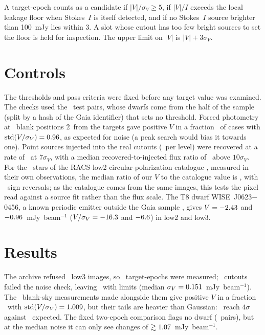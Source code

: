 \documentclass[RNAAS]{aastex631}
\begin{document}
A target-epoch counts as a candidate if $|V|/\sigma_V\geq5$, if $|V|/I$ exceeds the local
leakage floor when Stokes~$I$ is itself detected, and if no Stokes~$I$ source brighter than
100~mJy lies within 3\arcmin. A slot whose cutout has too few bright sources to set the floor is
held for inspection. The upper limit on $|V|$ is $|V|+3\sigma_V$.

\section{Controls}
\label{sec:controls}
The thresholds and pass criteria were fixed before any target value was examined. The checks
used the \ucdvRealSzeroN\ test pairs, whose dwarfs come from the half of the sample (split by a
hash of the Gaia identifier) that sets no threshold. Forced photometry at
\ucdvRealConeN\ blank positions 2\arcmin\ from the targets gave positive $V$ in a fraction
\ucdvRealConePos\ of cases with $\mathrm{std}(V/\sigma_V)=0.96$, as expected
for noise (a peak search would bias it towards one). Point
sources injected into the real cutouts (\ucdvRealCtwoN\ per level) were recovered at a rate of
\ucdvRealCtwoComp\ at $7\sigma_V$, with a median recovered-to-injected flux ratio of
\ucdvRealCtwoRatio\ above $10\sigma_V$. For the \ucdvRealCthreeN\ stars of the RACS-low2
circular-polarization catalogue \citep{duchesne2026}, measured in their own observations, the
median ratio of our $V$ to the catalogue value is \ucdvRealCthreeRatio, with
\ucdvRealCthreeFlips\ sign reversals; as the catalogue comes from the same images, this tests the
pixel read against a source fit rather than the flux scale. The T8 dwarf WISE~J0623$-$0456, a known periodic emitter
outside the Gaia sample \citep{rose2023}, gives $V=-2.43$ and
$-0.96$~mJy~beam$^{-1}$ ($V/\sigma_V=-16.3$ and
$-6.6$) in low2 and low3.

\section{Results}
\label{sec:results}
The archive refused \ucdvRealNMissing\ low3 images, so \ucdvRealNSlots\ target-epochs were
measured; \ucdvRealNInsane\ cutouts failed the noise check, leaving \ucdvRealNSane\ with limits
(median $\sigma_V=0.151$~mJy~beam$^{-1}$). The \ucdvRealNullN\ blank-sky measurements
made alongside them give positive $V$ in a fraction \ucdvRealNullPos\ with
$\mathrm{std}(V/\sigma_V)=1.009$, but their tails are heavier than Gaussian:
\ucdvRealNullNGeFour\ reach $4\sigma$ against \ucdvRealNullExpGeFour\ expected. The fixed
two-epoch comparison flags no dwarf (\ucdvRealNPairs\ pairs), but at the median noise it can only
see changes of $\gtrsim1.07$~mJy~beam$^{-1}$.
\end{document}
